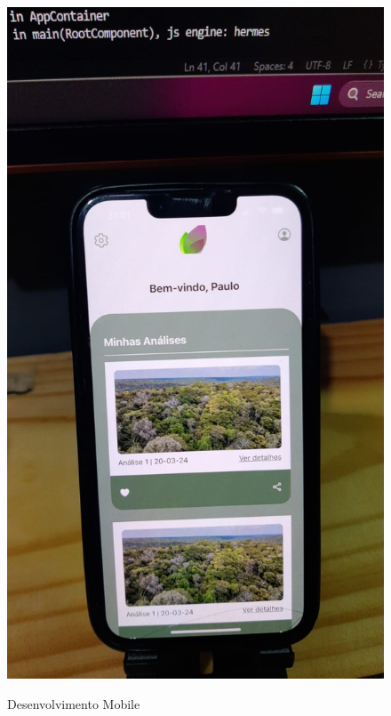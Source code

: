 \documentclass[
landscape,
  a4paper,%
  12pt,%
  english,%
  brazilian,%
]{article}
\begin{document}
\begin{figure}
  \centering
  \caption{Desenvolvimento Mobile}
  \includegraphics[width=.3\textwidth,keepaspectratio]{Logos/mobile01.jpeg}
  \label{fig:enter-label}
\end{figure}
\end{document}
